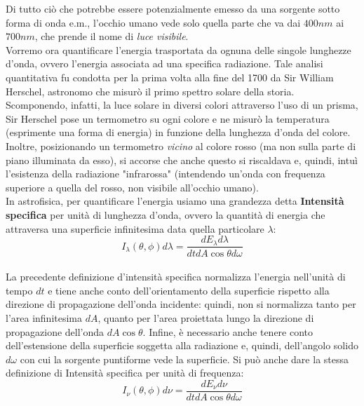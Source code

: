 \documentclass[a4paper,11pt]{article}
\begin{document}
Di tutto ciò che potrebbe essere potenzialmente emesso da una sorgente sotto forma di onda e.m., l'occhio umano vede solo quella parte che va dai \(400nm\)  ai \(700nm\), che prende il nome di \textit{luce visibile}. \\
Vorremo ora quantificare l'energia trasportata da ognuna delle singole lunghezze d'onda, ovvero l'energia associata ad una specifica radiazione. Tale analisi quantitativa fu condotta per la prima volta alla fine del 1700 da Sir William Herschel, astronomo che misurò il primo spettro solare della storia. Scomponendo, infatti, la luce solare in diversi colori attraverso l'uso di un prisma, Sir Herschel pose un termometro su ogni colore e ne misurò la temperatura (esprimente una forma di energia) in funzione della lunghezza d'onda del colore.
Inoltre, posizionando un termometro \textit{vicino} al colore rosso (ma non sulla parte di piano illuminata da esso), si accorse che anche questo si riscaldava e, quindi, intuì l'esistenza della radiazione "infrarossa" (intendendo un'onda con frequenza superiore a quella del rosso, non visibile all'occhio umano). \\

In astrofisica, per quantificare l'energia usiamo una grandezza detta \textbf{Intensità specifica} per unità di lunghezza d'onda, ovvero la quantità di energia che attraversa una superficie infinitesima data quella particolare \(\lambda\):
\begin{equation*}  
    I_{\lambda}(\theta,\phi)d\lambda = \frac{dE_{\lambda}d\lambda}{dtdA\cos{\theta}d\omega}
\end{equation*} \\

La precedente definizione d'intensità specifica normalizza l'energia nell'unità di tempo \(dt\) e tiene anche conto dell'orientamento della superficie rispetto alla direzione di propagazione dell'onda incidente: quindi, non si normalizza tanto per l'area infinitesima \(dA\), quanto per l'area proiettata lungo la direzione di propagazione dell'onda \(dA\cos{\theta} \). Infine, è necessario anche tenere conto dell'estensione  della superficie soggetta alla radiazione e, quindi, dell'angolo solido \(d\omega\) con cui la sorgente puntiforme vede la superficie. Si può anche dare la stessa definizione di Intensità specifica per unità di frequenza:
\begin{equation*}
    I_{\nu}(\theta,\phi)d\nu = \frac{dE_{\nu}d\nu}{dtdA\cos{\theta}d\omega}
\end{equation*} \\
\end{document}
